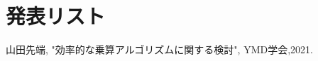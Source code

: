 \documentclass[12pt,dvipdfmx]{jarticle}
\begin{document}
%
%
\titlepage
\cmemberspage

%
%

\firstabstract
\secondabstract

%
%
\toc
\newpage
\listoffigures
\listoftables

%
%

\newpage
{}


\newpage


\newpage


\newpage



%
%


%
%
\newpage



%
% 
\newpage
\section*{発表リスト}
\noindent [1] 山田先端, "効率的な乗算アルゴリズムに関する検討", YMD学会,2021.


%
%

\end{document}

